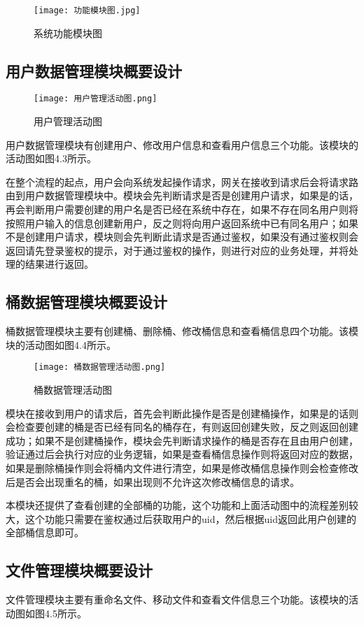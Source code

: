 \begin{figure}[h]
  \centering
  \texttt{[image: 功能模块图.jpg]}
  \caption{系统功能模块图}
\end{figure}

\subsection{用户数据管理模块概要设计}
\begin{figure}[h]
  \centering
  \texttt{[image: 用户管理活动图.png]}
  \caption{用户管理活动图}
\end{figure}

用户数据管理模块有创建用户、修改用户信息和查看用户信息三个功能。该模块的活动图如图4.3所示。

在整个流程的起点，用户会向系统发起操作请求，网关在接收到请求后会将请求路由到用户数据管理模块中。模块会先判断请求是否是创建用户请求，如果是的话，再会判断用户需要创建的用户名是否已经在系统中存在，如果不存在同名用户则将按照用户输入的信息创建新用户，反之则将向用户返回系统中已有同名用户；如果不是创建用户请求，模块则会先判断此请求是否通过鉴权，如果没有通过鉴权则会返回请先登录鉴权的提示，对于通过鉴权的操作，则进行对应的业务处理，并将处理的结果进行返回。
\subsection{桶数据管理模块概要设计}
桶数据管理模块主要有创建桶、删除桶、修改桶信息和查看桶信息四个功能。该模块的活动图如图4.4所示。

\begin{figure}[h]
  \centering
  \texttt{[image: 桶数据管理活动图.png]}
  \caption{桶数据管理活动图}
\end{figure}

模块在接收到用户的请求后，首先会判断此操作是否是创建桶操作，如果是的话则会检查要创建的桶是否已经有同名的桶存在，有则返回创建失败，反之则返回创建成功；如果不是创建桶操作，模块会先判断请求操作的桶是否存在且由用户创建，验证通过后会执行对应的业务逻辑，如果是查看桶信息操作则将返回对应的数据，如果是删除桶操作则会将桶内文件进行清空，如果是修改桶信息操作则会检查修改后是否会出现重名的桶，如果出现则不允许这次修改桶信息的请求。

本模块还提供了查看创建的全部桶的功能，这个功能和上面活动图中的流程差别较大，这个功能只需要在鉴权通过后获取用户的uid，然后根据uid返回此用户创建的全部桶信息即可。
\subsection{文件管理模块概要设计}
文件管理模块主要有重命名文件、移动文件和查看文件信息三个功能。该模块的活动图如图4.5所示。

